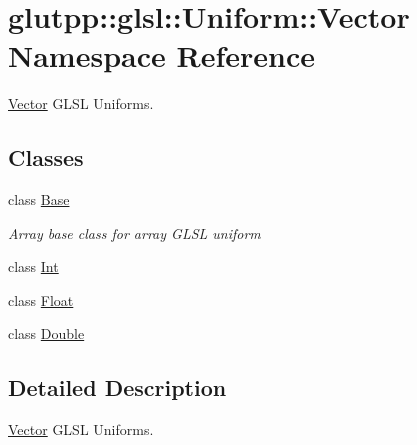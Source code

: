 \hypertarget{namespaceglutpp_1_1glsl_1_1Uniform_1_1Vector}{\section{glutpp\-:\-:glsl\-:\-:\-Uniform\-:\-:\-Vector \-Namespace \-Reference}
\label{namespaceglutpp_1_1glsl_1_1Uniform_1_1Vector}
}


\hyperlink{namespaceglutpp_1_1glsl_1_1Uniform_1_1Vector}{\-Vector} \-G\-L\-S\-L \-Uniforms.  


\subsection*{\-Classes}
\begin{DoxyCompactItemize}
\item 
class \hyperlink{classglutpp_1_1glsl_1_1Uniform_1_1Vector_1_1Base}{\-Base}
\begin{DoxyCompactList}\small\item\em \-Array base class for array \-G\-L\-S\-L uniform \end{DoxyCompactList}\item 
class \hyperlink{classglutpp_1_1glsl_1_1Uniform_1_1Vector_1_1Int}{\-Int}
\item 
class \hyperlink{classglutpp_1_1glsl_1_1Uniform_1_1Vector_1_1Float}{\-Float}
\item 
class \hyperlink{classglutpp_1_1glsl_1_1Uniform_1_1Vector_1_1Double}{\-Double}
\end{DoxyCompactItemize}


\subsection{\-Detailed \-Description}
\hyperlink{namespaceglutpp_1_1glsl_1_1Uniform_1_1Vector}{\-Vector} \-G\-L\-S\-L \-Uniforms. 